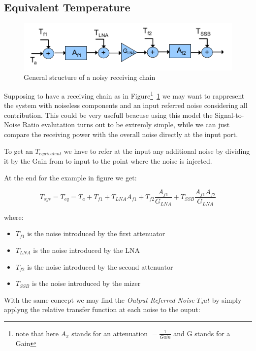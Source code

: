 


\subsection{Equivalent Temperature} %
\label{sub:equivalent_temperature}

\begin{figure} [h!]
	\centering
	\includegraphics[scale=1]{Immagini/Teq}
	
	\caption{General structure of a noisy receiving chain}
	\label{fig:Teq}
\end{figure}


Supposing to have a receiving chain as in Figure\footnote{note that here $A_x$ stands for an attenuation $= \frac{1}{Gain}$ and G stands for a Gain}~\ref{fig:Teq} we may want to rappresent the system with noiseless components and an input referred noise considering all contribution.
This could be very usefull beacuse using this model the Signal-to-Noise Ratio evalutation turns out to be extremly simple, while we can just compare the receiving power with the overall noise directly at the input port.

To get an $T_{equivalent}$ we have to refer at the input any additional noise by dividing it by the Gain from to input to the point where the noise is injected.

At the end for the example in figure we get:

\begin{equation}
	T_{sys}=T_{eq}= T_a + T_{f1} + T_{LNA} A_{f1}+ T_{f2} \frac { A_{f1} } {G_{LNA}} + T_{SSB} \frac { A_{f1} A_{f2} } {G_{LNA}}
\end{equation}

where:
\begin{itemize}
	\item $T_{f1}$ is the noise introduced by the first attenuator
	\item $T_{LNA}$ is the noise introduced by the LNA
	\item $T_{f2}$ is the noise introduced by the second attenuator
	\item $T_{SSB}$ is the noise introduced by the mizer
\end{itemize}
With the same concept we may find the \textit{Output Referred Noise} $T_out$ by simply applyng the relative transfer function at each noise to the ouput:

